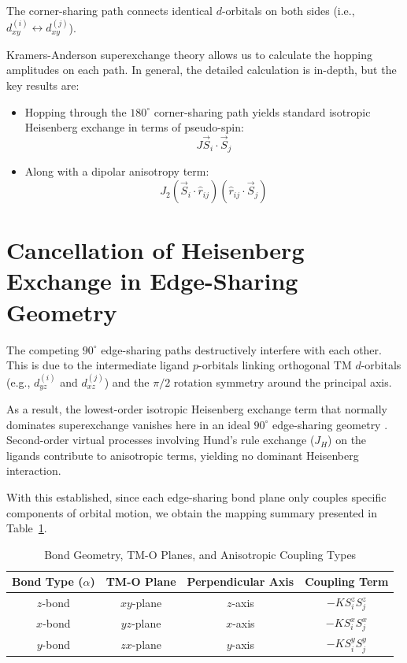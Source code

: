 \documentclass[11pt,a4paper]{article}
\begin{document}
The corner-sharing path connects identical $d$-orbitals on both sides (i.e., $d_{xy}^{(i)} \leftrightarrow d_{xy}^{(j)}$).

Kramers-Anderson superexchange theory allows us to calculate the hopping amplitudes on each path. In general, the detailed calculation is in-depth, but the key results are:
\begin{itemize}
    \item Hopping through the $180^\circ$ corner-sharing path yields standard isotropic Heisenberg exchange in terms of pseudo-spin:
    \begin{equation}
        J \vec{S}_i \cdot \vec{S}_j
    \end{equation}
    \item Along with a dipolar anisotropy term:
    \begin{equation}
        J_2 (\vec{S}_i \cdot \hat{r}_{ij}) (\hat{r}_{ij} \cdot \vec{S}_j)
    \end{equation}
\end{itemize}

\section{Cancellation of Heisenberg Exchange in Edge-Sharing Geometry}

The competing $90^\circ$ edge-sharing paths destructively interfere with each other. This is due to the intermediate ligand $p$-orbitals linking orthogonal TM $d$-orbitals (e.g., $d_{yz}^{(i)}$ and $d_{xz}^{(j)}$) and the $\pi/2$ rotation symmetry around the principal axis.

As a result, the lowest-order isotropic Heisenberg exchange term that normally dominates superexchange vanishes here in an ideal $90^\circ$ edge-sharing geometry \label{ref-angular}. Second-order virtual processes involving Hund's rule exchange ($J_H$) on the ligands contribute to anisotropic terms, yielding no dominant Heisenberg interaction.

With this established, since each edge-sharing bond plane only couples specific components of orbital motion, we obtain the mapping summary presented in Table~\ref{tab:bonds}.

\begin{table}[h]
\centering
\caption{Bond Geometry, TM-O Planes, and Anisotropic Coupling Types}
\label{tab:bonds}
\vspace{2mm}
\begin{tabular}{cccc}
\toprule
\textbf{Bond Type ($\alpha$)} & \textbf{TM-O Plane} & \textbf{Perpendicular Axis} & \textbf{Coupling Term} \\
\midrule
$z$-bond & $xy$-plane & $z$-axis & $-K S_i^z S_j^z$ \\
$x$-bond & $yz$-plane & $x$-axis & $-K S_i^x S_j^x$ \\
$y$-bond & $zx$-plane & $y$-axis & $-K S_i^y S_j^y$ \\
\bottomrule
\end{tabular}
\end{table}
\end{document}
